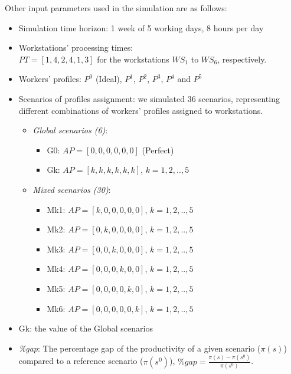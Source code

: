 \documentclass[review,12pt, 3p, times]{elsarticle}
\begin{document}
Other input parameters used in the simulation are as follows:
\begin{itemize}
    \item Simulation time horizon: 1 week of 5 working days, 8 hours per day
    \item Workstations' processing times:\\ $PT=[1,4,2,4,1,3]$ for the workstations $\textit{WS}_1$ to $\textit{WS}_6$, respectively.
    \item Workers' profiles: $P^0$ (Ideal), $P^1$, $P^2$, $P^3$, $P^4$ and $P^5$ 
    \item Scenarios of profiles assignment: we simulated 36 scenarios, representing different combinations of workers' profiles assigned to workstations.
        \begin{itemize}
            \item  \textit{Global scenarios (6)}:
                \begin{itemize}
                    \item 	 \hspace*{0.5cm} G0: $AP=[0,0,0,0,0,0]$ (Perfect)
                    \item    \hspace*{0.5cm} Gk: $AP=[k,k,k,k,k,k]$, $k=1,2,..,5$ 
                \end{itemize}
            \item  \textit{Mixed scenarios (30)}: 
                \begin{itemize}
                    \item 	  \hspace*{0.5cm} Mk1: $AP=[k,0,0,0,0,0]$, $k=1,2,..,5$
                    \item     \hspace*{0.5cm} Mk2: $AP=[0,k,0,0,0,0]$, $k=1,2,..,5$
                    \item    \hspace*{0.5cm} Mk3: $AP=[0,0,k,0,0,0]$, $k=1,2,..,5$
                    \item    \hspace*{0.5cm} Mk4: $AP=[0,0,0,k,0,0]$, $k=1,2,..,5$
                    \item    \hspace*{0.5cm} Mk5: $AP=[0,0,0,0,k,0]$, $k=1,2,..,5$
                    \item    \hspace*{0.5cm} Mk6: $AP=[0,0,0,0,0,k]$, $k=1,2,..,5$
                \end{itemize}
        \end{itemize}
    \item Gk: the value of the Global scenarios
    \item {\it{\%gap}}:  The percentage gap of the productivity of a given scenario ($\pi(s)$) compared to a reference scenario ($\pi(s^0)$),  $\textit{\%gap}=\frac{ \pi(s) - \pi(s^0)}{\pi(s^0)}$.
\end{itemize}
\end{document}
